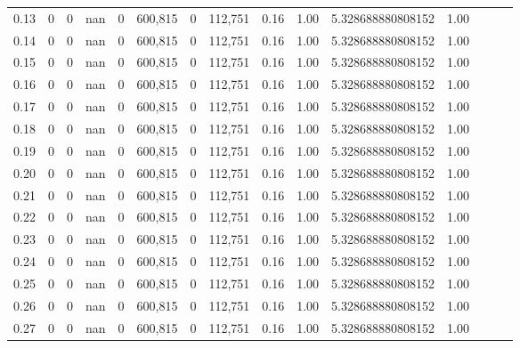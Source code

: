 \begin{tabular}{rrrrrrrrrrrrrrr}
0.13 &        0 &       0 &   nan &        0 &  600,815 &        0 &  112,751 &  0.16 &  1.00 &       5.328688880808152 &      1.00 \\
0.14 &        0 &       0 &   nan &        0 &  600,815 &        0 &  112,751 &  0.16 &  1.00 &       5.328688880808152 &      1.00 \\
0.15 &        0 &       0 &   nan &        0 &  600,815 &        0 &  112,751 &  0.16 &  1.00 &       5.328688880808152 &      1.00 \\
0.16 &        0 &       0 &   nan &        0 &  600,815 &        0 &  112,751 &  0.16 &  1.00 &       5.328688880808152 &      1.00 \\
0.17 &        0 &       0 &   nan &        0 &  600,815 &        0 &  112,751 &  0.16 &  1.00 &       5.328688880808152 &      1.00 \\
0.18 &        0 &       0 &   nan &        0 &  600,815 &        0 &  112,751 &  0.16 &  1.00 &       5.328688880808152 &      1.00 \\
0.19 &        0 &       0 &   nan &        0 &  600,815 &        0 &  112,751 &  0.16 &  1.00 &       5.328688880808152 &      1.00 \\
0.20 &        0 &       0 &   nan &        0 &  600,815 &        0 &  112,751 &  0.16 &  1.00 &       5.328688880808152 &      1.00 \\
0.21 &        0 &       0 &   nan &        0 &  600,815 &        0 &  112,751 &  0.16 &  1.00 &       5.328688880808152 &      1.00 \\
0.22 &        0 &       0 &   nan &        0 &  600,815 &        0 &  112,751 &  0.16 &  1.00 &       5.328688880808152 &      1.00 \\
0.23 &        0 &       0 &   nan &        0 &  600,815 &        0 &  112,751 &  0.16 &  1.00 &       5.328688880808152 &      1.00 \\
0.24 &        0 &       0 &   nan &        0 &  600,815 &        0 &  112,751 &  0.16 &  1.00 &       5.328688880808152 &      1.00 \\
0.25 &        0 &       0 &   nan &        0 &  600,815 &        0 &  112,751 &  0.16 &  1.00 &       5.328688880808152 &      1.00 \\
0.26 &        0 &       0 &   nan &        0 &  600,815 &        0 &  112,751 &  0.16 &  1.00 &       5.328688880808152 &      1.00 \\
0.27 &        0 &       0 &   nan &        0 &  600,815 &        0 &  112,751 &  0.16 &  1.00 &       5.328688880808152 &      1.00 \\

\end{tabular}
